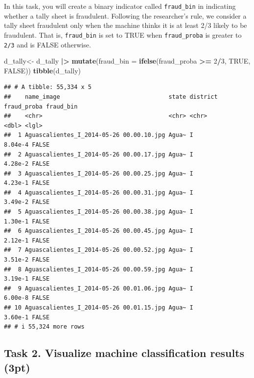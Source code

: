 \documentclass[
]{article}
\newenvironment{Shaded}{\begin{snugshade}}{\end{snugshade}}
\newcommand{\AttributeTok}[1]{\textcolor[rgb]{0.13,0.29,0.53}{#1}}
\newcommand{\ConstantTok}[1]{\textcolor[rgb]{0.56,0.35,0.01}{#1}}
\newcommand{\DecValTok}[1]{\textcolor[rgb]{0.00,0.00,0.81}{#1}}
\newcommand{\FunctionTok}[1]{\textcolor[rgb]{0.13,0.29,0.53}{\textbf{#1}}}
\newcommand{\NormalTok}[1]{#1}
\newcommand{\OtherTok}[1]{\textcolor[rgb]{0.56,0.35,0.01}{#1}}
\newcommand{\SpecialCharTok}[1]{\textcolor[rgb]{0.81,0.36,0.00}{\textbf{#1}}}
\begin{document}
In this task, you will create a binary indicator called
\texttt{fraud\_bin} in indicating whether a tally sheet is fraudulent.
Following the researcher's rule, we consider a tally sheet fraudulent
only when the machine thinks it is at least 2/3 likely to be fraudulent.
That is, \texttt{fraud\_bin} is set to TRUE when \texttt{fraud\_proba}
is greater to \texttt{2/3} and is FALSE otherwise.

\begin{Shaded}
\begin{Highlighting}[]
\NormalTok{d\_tally}\OtherTok{\textless{}{-}}\NormalTok{ d\_tally }\SpecialCharTok{|\textgreater{}}
  \FunctionTok{mutate}\NormalTok{(}\AttributeTok{fraud\_bin =} \FunctionTok{ifelse}\NormalTok{(fraud\_proba }\SpecialCharTok{\textgreater{}=} \DecValTok{2}\SpecialCharTok{/}\DecValTok{3}\NormalTok{, }\ConstantTok{TRUE}\NormalTok{, }\ConstantTok{FALSE}\NormalTok{))}
\FunctionTok{tibble}\NormalTok{(d\_tally)}
\end{Highlighting}
\end{Shaded}

\begin{verbatim}
## # A tibble: 55,334 x 5
##    name_image                               state district fraud_proba fraud_bin
##    <chr>                                    <chr> <chr>          <dbl> <lgl>    
##  1 Aguascalientes_I_2014-05-26 00.00.10.jpg Agua~ I            8.04e-4 FALSE    
##  2 Aguascalientes_I_2014-05-26 00.00.17.jpg Agua~ I            4.28e-2 FALSE    
##  3 Aguascalientes_I_2014-05-26 00.00.25.jpg Agua~ I            4.23e-1 FALSE    
##  4 Aguascalientes_I_2014-05-26 00.00.31.jpg Agua~ I            3.49e-2 FALSE    
##  5 Aguascalientes_I_2014-05-26 00.00.38.jpg Agua~ I            1.30e-1 FALSE    
##  6 Aguascalientes_I_2014-05-26 00.00.45.jpg Agua~ I            2.12e-1 FALSE    
##  7 Aguascalientes_I_2014-05-26 00.00.52.jpg Agua~ I            3.51e-2 FALSE    
##  8 Aguascalientes_I_2014-05-26 00.00.59.jpg Agua~ I            3.19e-1 FALSE    
##  9 Aguascalientes_I_2014-05-26 00.01.06.jpg Agua~ I            6.00e-8 FALSE    
## 10 Aguascalientes_I_2014-05-26 00.01.15.jpg Agua~ I            3.60e-1 FALSE    
## # i 55,324 more rows
\end{verbatim}

\clearpage

\hypertarget{task-2.-visualize-machine-classification-results-3pt}{%
\subsection{Task 2. Visualize machine classification results
(3pt)}\label{task-2.-visualize-machine-classification-results-3pt}}
\end{document}
